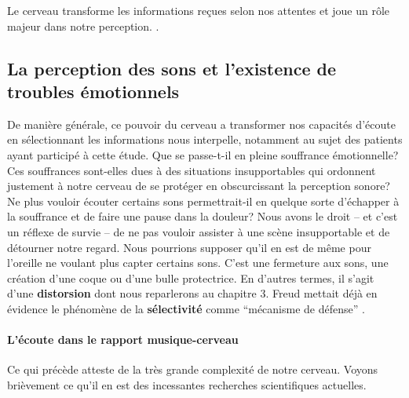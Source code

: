 Le cerveau
transforme les informations reçues selon nos attentes et joue un
rôle majeur dans notre perception.
\autocite%
{roque:lecoute}.
%
\subsection{La perception des sons et l'existence de troubles
  émotionnels}
De manière générale, ce pouvoir du cerveau a transformer nos capacités d'écoute en sélectionnant les informations nous interpelle, notamment au sujet des  patients ayant participé à cette étude.
Que se passe-t-il en pleine
souffrance émotionnelle? Ces souffrances sont-elles dues à des situations
insupportables qui
ordonnent justement à notre cerveau de se protéger en obscurcissant la
perception sonore?  Ne plus vouloir écouter certains
sons permettrait-il en quelque sorte d'échapper à la souffrance et de faire une
pause dans la douleur? Nous avons le droit -- et c'est un réflexe de
survie -- de ne pas vouloir assister à une scène insupportable et de détourner
notre regard.  Nous pourrions supposer qu'il en est de même pour l'oreille ne voulant plus capter
certains sons. C'est une fermeture aux sons, une création d'une coque ou d'une bulle protectrice. En d'autres termes, il s'agit d'une \textbf{distorsion} dont nous reparlerons au chapitre 3.
Freud mettait déjà en évidence le phénomène de la
\textbf{sélectivité } comme ``mécanisme de défense'' \autocite{ Freud}.













\paragraph{ L'écoute dans le rapport
  musique-cerveau}
Ce qui précède atteste de la très grande complexité de notre cerveau.
Voyons brièvement ce qu'il en est des incessantes recherches scientifiques actuelles.

